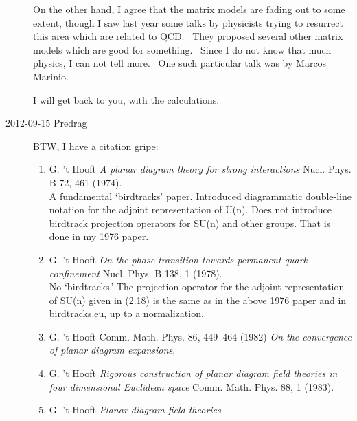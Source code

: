 \begin{description}
On the other hand, I agree that the matrix models are fading out to some
extent, though I saw last year some talks by physicists trying to resurrect
this area which are related to QCD.  They proposed several other matrix
models which are good for something.  Since I do not know that much
physics, I can not tell more.  One such particular talk was by Marcos
Marinio.

I will get back to you, with the calculations.

\item[2012-09-15 Predrag]
BTW, I have a citation gripe:
\begin{enumerate}

  \item
G. 't Hooft
{\emph{A planar diagram theory for strong interactions}}
Nucl. Phys. B 72, 461 (1974).\\
 A fundamental `birdtracks' paper.	Introduced diagrammatic double-line
 notation for the adjoint representation of U(n). Does not introduce
 birdtrack projection operators for SU(n) and other groups. That is done
 in my 1976 paper.

  \item
G. 't Hooft
{\emph{On the phase transition towards permanent quark confinement}}
 Nucl. Phys. B 138, 1 (1978).\\
No `birdtracks.'	The projection operator for the adjoint
representation of SU(n) given in (2.18) is the same as in the above 1976
paper and in  {birdtracks.eu}, up to
a normalization.	

  \item
G. 't Hooft
Comm. Math. Phys. {86}, {449--464} (1982)
{\emph{On the convergence of planar diagram expansions}},

  \item
 G. 't Hooft
{\emph{Rigorous construction of planar diagram field theories in four
       dimensional {Euclidean} space}}
 Comm. Math. Phys. {88}, 1 (1983). %

  \item
 G. 't Hooft
{{\em Planar diagram field theories}}


\end{enumerate}
\end{description}
